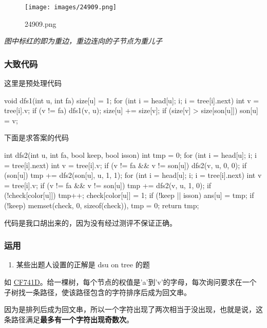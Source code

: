 \begin{figure}[h]
\centering
\texttt{[image: images/24909.png]} 
\caption{24909.png}
\end{figure} 

 {\em 图中标红的即为重边，重边连向的子节点为重儿子 } 

\subsubsection{大致代码}

这里是预处理代码

\begin{cppcode}
void dfs1(int u, int fa) {
  size[u] = 1;
  for (int i = head[u]; i; i = tree[i].next) {
    int v = tree[i].v;
    if (v != fa) {
      dfs1(v, u);
      size[u] += size[v];
      if (size[v] > size[son[u]]) son[u] = v;
    }
  }
}
\end{cppcode}

下面是求答案的代码

\begin{cppcode}
int dfs2(int u, int fa, bool keep, bool isson) {
  int tmp = 0;
  for (int i = head[u]; i; i = tree[i].next) {
    int v = tree[i].v;
    if (v != fa && v != son[u]) {
      dfs2(v, u, 0, 0);
    }
  }
  if (son[u]) tmp += dfs2(son[u], u, 1, 1);
  for (int i = head[u]; i; i = tree[i].next) {
    int v = tree[i].v;
    if (v != fa && v != son[u]) {
      tmp += dfs2(v, u, 1, 0);
    }
  }
  if (!check[color[u]]) {
    tmp++;
    check[color[u]] = 1;
  }
  if (!keep || isson) ans[u] = tmp;
  if (!keep) memset(check, 0, sizeof(check)), tmp = 0;
  return tmp;
}
\end{cppcode}

代码是我口胡出来的，因为没有经过测评不保证正确。

\subsubsection{运用}

\begin{enumerate}
\item 某些出题人设置的正解是 dsu on tree 的题
\end{enumerate}

如 \href{http://codeforces.com/problemset/problem/741/D}{CF741D}。给一棵树，每个节点的权值是'a'到'v'的字母，每次询问要求在一个子树找一条路径，使该路径包含的字符排序后成为回文串。

因为是排列后成为回文串，所以一个字符出现了两次相当于没出现，也就是说，这条路径满足\textbf{最多有一个字符出现奇数次}。

